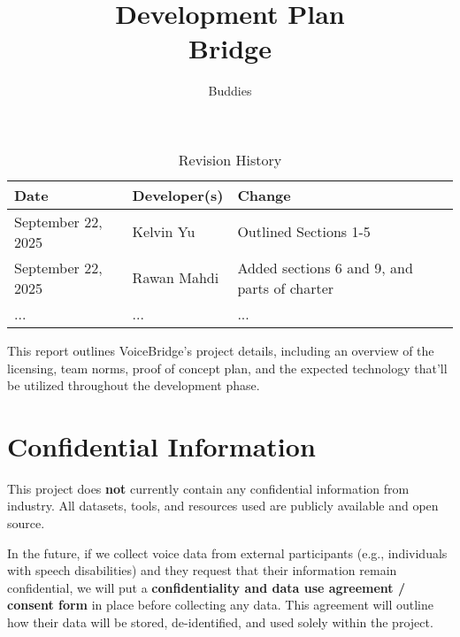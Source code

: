 \documentclass{article}
\title{Development Plan\\\Voice Bridge}
\author{\Speech Buddies}
\date{}
\begin{document}
\maketitle

\begin{table}[hp]
\caption{Revision History} \label{TblRevisionHistory}
\begin{tabularx}{\textwidth}{llX}
\toprule
\textbf{Date} & \textbf{Developer(s)} & \textbf{Change}\\
\midrule
September 22, 2025 & Kelvin Yu & Outlined Sections 1-5\\
September 22, 2025 & Rawan Mahdi & Added sections 6 and 9, and parts of charter \\
... & ... & ...\\
\bottomrule
\end{tabularx}
\end{table}

\newpage{}

\begin{comment}\wss{Put your introductory blurb here.  Often the blurb is a brief roadmap of
what is contained in the report.}
\end{comment}

This report outlines VoiceBridge’s project details, including an overview of the licensing, team norms, proof of concept plan, and the expected technology that’ll be utilized throughout the development phase.

\begin{comment}\wss{Additional information on the development plan can be found in the
\href{https://gitlab.cas.mcmaster.ca/courses/capstone/-/blob/main/Lectures/L02b_POCAndDevPlan/POCAndDevPlan.pdf?ref_type=heads}
{lecture slides}.}
\end{comment}



\section{Confidential Information}

This project does \textbf{not} currently contain any confidential information from industry. All datasets, tools, and resources used are publicly available and open source.

In the future, if we collect voice data from external participants (e.g., individuals with speech disabilities) and they request that their information remain confidential, we will put a \textbf{confidentiality and data use agreement / consent form} in place before collecting any data. This agreement will outline how their data will be stored, de-identified, and used solely within the project.
\end{document}
